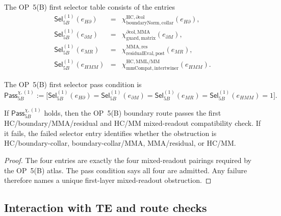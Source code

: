 \begin{definition}
\label{def:v410r21-op5b-first-selector-table}
The OP~5(B) first selector table consists of the entries
\[
\begin{array}{rcl}
\mathsf{Sel}^{(1)}_{5B}(e_{H\partial}) &=&
\chi^{\mathrm{HC},\partial\mathrm{col}}_{\mathrm{boundaryNorm},\mathrm{collar}}(e_{H\partial}),\\
\mathsf{Sel}^{(1)}_{5B}(e_{\partial M}) &=&
\chi^{\partial\mathrm{col},\mathrm{MMA}}_{\mathrm{guard},\mathrm{matrix}}(e_{\partial M}),\\
\mathsf{Sel}^{(1)}_{5B}(e_{MR}) &=&
\chi^{\mathrm{MMA},\mathrm{res}}_{\mathrm{residualEval},\mathrm{post}}(e_{MR}),\\
\mathsf{Sel}^{(1)}_{5B}(e_{HMM}) &=&
\chi^{\mathrm{HC},\mathrm{MML/MM}}_{\mathrm{mmCompat},\mathrm{intertwiner}}(e_{HMM}).
\end{array}
\]
\end{definition}

\begin{definition}
\label{def:v410r21-op5b-selector-pass}
The OP~5(B) first selector pass condition is
\[
 \mathsf{Pass}_{5B}^{\chi,(1)}
 :=
 \bigl[
 \mathsf{Sel}^{(1)}_{5B}(e_{H\partial})=
 \mathsf{Sel}^{(1)}_{5B}(e_{\partial M})=
 \mathsf{Sel}^{(1)}_{5B}(e_{MR})=
 \mathsf{Sel}^{(1)}_{5B}(e_{HMM})=1
 \bigr].
\]
\end{definition}

\begin{proposition}
\label{prop:v410r21-op5b-first-selector-diagnostic}
If \(\mathsf{Pass}_{5B}^{\chi,(1)}\) holds, then the OP~5(B) boundary route
passes the first HC/boundary/MMA/residual and HC/MM mixed-readout compatibility
check. If it fails, the failed selector entry identifies whether the
obstruction is HC/boundary-collar, boundary-collar/MMA, MMA/residual, or HC/MM.
\end{proposition}

\begin{proof}
The four entries are exactly the four mixed-readout pairings required by the
OP~5(B) atlas. The pass condition says all four are admitted. Any failure
therefore names a unique first-layer mixed-readout obstruction.
\end{proof}

\subsection{Interaction with TE and route checks}
\label{subsec:v410r21-interaction-with-te-route-checks}

